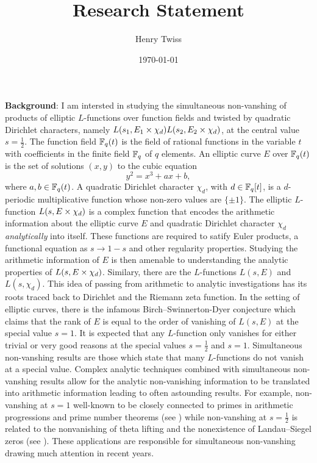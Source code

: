 \documentclass[12pt,reqno,oneside]{amsart}
\title{Research Statement}
\author{Henry Twiss}
\date{\today}
\begin{document}
\maketitle

\textbf{Background}: I am intersted in studying the simultaneous non-vanshing of products of elliptic $L$-functions over function fields and twisted by quadratic Dirichlet characters, namely $L(s_{1},E_{1} \times \chi_{d})L(s_{2},E_{2} \times \chi_{d})$, at the central value $s = \frac{1}{2}$. The function field $\mathbb{F}_{q}(t)$ is the field of rational functions in the variable $t$ with coefficients in the finite field $\mathbb{F}_{q}$ of $q$ elements. An elliptic curve $E$ over $\mathbb{F}_{q}(t)$ is the set of solutions $(x,y)$ to the cubic equation
\[
  y^{2} = x^{3}+ax+b,
\]
where $a,b \in \mathbb{F}_{q}(t)$. A quadratic Dirichlet character $\chi_{d}$, with $d \in \mathbb{F}_{q}[t]$, is a $d$-periodic multiplicative function whose non-zero values are $\{\pm1\}$. The elliptic $L$-function $L(s,E \times \chi_{d})$ is a complex function that encodes the arithmetic information about the elliptic curve $E$ and quadratic Dirichlet character $\chi_{d}$ \textit{analytically} into itself. These functions are required to satify Euler products, a functional equation as $s \to 1-s$ and other regularity properties. Studying the arithmetic information of $E$ is then amenable to understanding the analytic properties of $L(s,E \times \chi_{d})$. Similary, there are the $L$-functions $L(s,E)$ and $L(s, \chi_{d})$. This idea of passing from arithmetic to analytic investigations has its roots traced back to Dirichlet and the Riemann zeta function. In the setting of elliptic curves, there is the infamous Birch–Swinnerton-Dyer conjecture which claims that the rank of $E$ is equal to the order of vanishing of $L(s,E)$ at the special value $s = 1$. It is expected that any $L$-function only vanishes for either trivial or very good reasons at the special values $s = \frac{1}{2}$ and $s = 1$. Simultaneous non-vanshing results are those which state that many $L$-functions do not vanish at a special value. Complex analytic techniques combined with simultaneous non-vanshing results allow for the analytic non-vanishing information to be translated into arithmetic information leading to often astounding results. For example, non-vanshing at $s = 1$ well-known to be closely connected to primes in arithmetic progressions and prime number theorems (see \cite{M}) while non-vanshing at $s = \frac{1}{2}$ is related to the nonvanishing of theta lifting and the nonexistence of Landau–Siegel zeros (see ). These applications are responsible for simultaneous non-vanshing drawing much attention in recent years.
\end{document}
